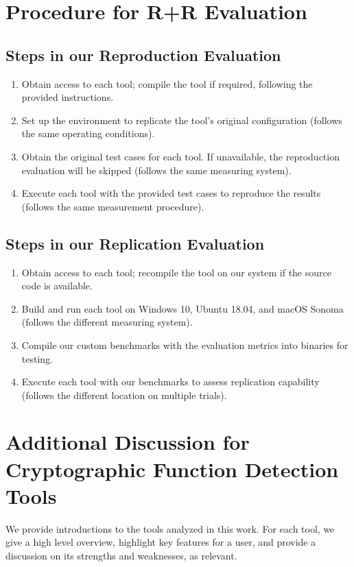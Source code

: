 \section{Procedure for R+R Evaluation}

\subsection{Steps in our Reproduction Evaluation}
\label{app:cryptobinary-repro_procedure}
\begin{enumerate}
\item Obtain access to each tool; compile the tool if required, following the provided instructions.
\item Set up the environment to replicate the tool's original configuration (follows the same operating conditions).
\item Obtain the original test cases for each tool. If unavailable, the reproduction evaluation will be skipped (follows the same measuring system).
\item Execute each tool with the provided test cases to reproduce the results (follows the same measurement procedure).
\end{enumerate}

\subsection{Steps in our Replication Evaluation}
\label{app:cryptobinary-repli_procedure}
\begin{enumerate}
\item Obtain access to each tool; recompile the tool on our system if the source code is available.
\item Build and run each tool on Windows 10, Ubuntu 18.04, and macOS Sonoma (follows the different measuring system).
\item Compile our custom benchmarks with the evaluation metrics into binaries for testing.
\item Execute each tool with our benchmarks to assess replication capability (follows the different location on multiple trials).
\end{enumerate}

\section{Additional Discussion for Cryptographic Function Detection Tools}
\label{app:cryptobinary-tools}
We provide introductions to the tools analyzed in this work.  For each tool, we give a high level overview, highlight key features for a user, and provide a discussion on its strengths and weaknesses, as relevant.


